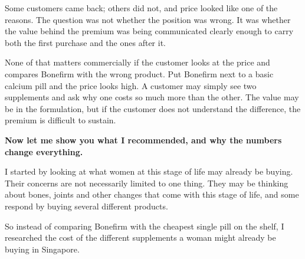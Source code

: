 \documentclass[10pt,twoside,openany]{memoir}
\begin{document}
Some customers came back; others did not, and price looked like one of
the reasons. The question was not whether the position was wrong. It was
whether the value behind the premium was being communicated clearly
enough to carry both the first purchase and the ones after it.

None of that matters commercially if the customer looks at the price and
compares Bonefirm with the wrong product. Put Bonefirm next to a basic
calcium pill and the price looks high. A customer may simply see two
supplements and ask why one costs so much more than the other. The value
may be in the formulation, but if the customer does not understand the
difference, the premium is difficult to sustain.

\textbf{Now let me show you what I recommended, and why the numbers
change everything.}

I started by looking at what women at this stage of life may already be
buying. Their concerns are not necessarily limited to one thing. They
may be thinking about bones, joints and other changes that come with
this stage of life, and some respond by buying several different
products.

So instead of comparing Bonefirm with the cheapest single pill on the
shelf, I researched the cost of the different supplements a woman might
already be buying in Singapore.
\end{document}

